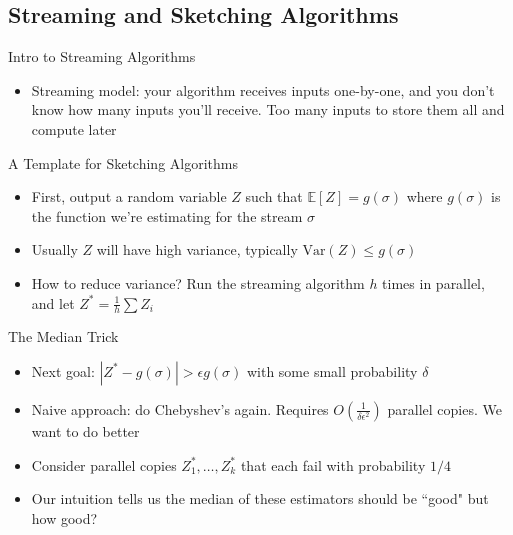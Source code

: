 \documentclass[aspectratio=169]{beamer}
\begin{document}
\subsection{Streaming and Sketching Algorithms}

\frame{\subsectionpage}

\begin{frame}{Intro to Streaming Algorithms}
\protect\hypertarget{intro-to-streaming-algorithms}{}
\begin{itemize}
\tightlist
\item
  Streaming model: your algorithm receives inputs one-by-one, and you
  don't know how many inputs you'll receive. Too many inputs to store
  them all and compute later 
\end{itemize}
\end{frame}

\begin{frame}{A Template for Sketching Algorithms}
\protect\hypertarget{a-template-for-sketching-algorithms}{}
\begin{itemize}
\tightlist
\item
  First, output a random variable \(Z\) such that
  \(\mathbb{E}[Z] = g(\sigma)\) where \(g(\sigma)\) is the function
  we're estimating for the stream \(\sigma\)
\item
  Usually \(Z\) will have high variance, typically
  \(\text{Var}(Z) \leq g(\sigma)\)
\item
  How to reduce variance? Run the streaming algorithm \(h\) times in
  parallel, and let \(Z^* = \frac{1}{h}\sum Z_i\)
\end{itemize}
\end{frame}

\begin{frame}{The Median Trick}
\protect\hypertarget{the-median-trick}{}
\begin{itemize}
\tightlist
\item
  Next goal: \(|Z^* - g(\sigma)| > \epsilon g(\sigma)\) with some small
  probability \(\delta\) \pause
\item
  Naive approach: do Chebyshev's again. Requires
  \(O\left(\frac{1}{\delta \epsilon^2} \right)\) parallel copies. We
  want to do better \pause
\item
  Consider parallel copies \(Z^*_1, \dots, Z^*_k\) that each fail with
  probability \(1/4\) \pause
\item
  Our intuition tells us the median of these estimators should be
  ``good" but how good?
\end{itemize}
\end{frame}
\end{document}
